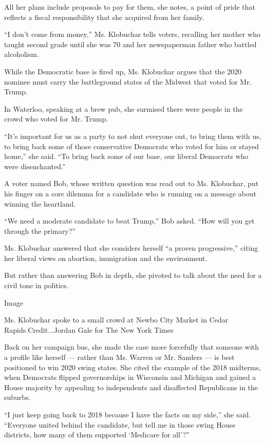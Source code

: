 All her plans include proposals to pay for them, she notes, a point of
pride that reflects a fiscal responsibility that she acquired from her
family.

``I don't come from money,'' Ms. Klobuchar tells voters, recalling her
mother who taught second grade until she was 70 and her newspaperman
father who battled alcoholism.

While the Democratic base is fired up, Ms. Klobuchar argues that the
2020 nominee must carry the battleground states of the Midwest that
voted for Mr. Trump.

In Waterloo, speaking at a brew pub, she surmised there were people in
the crowd who voted for Mr. Trump.

``It's important for us as a party to not shut everyone out, to bring
them with us, to bring back some of those conservative Democrats who
voted for him or stayed home,'' she said. ``To bring back some of our
base, our liberal Democrats who were disenchanted.''

A voter named Bob, whose written question was read out to Ms. Klobuchar,
put his finger on a core dilemma for a candidate who is running on a
message about winning the heartland.

``We need a moderate candidate to beat Trump,'' Bob asked. ``How will
you get through the primary?''

Ms. Klobuchar answered that she considers herself ``a proven
progressive,'' citing her liberal views on abortion, immigration and the
environment.

But rather than answering Bob in depth, she pivoted to talk about the
need for a civil tone in politics.

Image

Ms. Klobuchar spoke to a small crowd at Newbo City Market in Cedar
Rapids.Credit...Jordan Gale for The New York Times

Back on her campaign bus, she made the case more forcefully that someone
with a profile like herself --- rather than Ms. Warren or Mr. Sanders
--- is best positioned to win 2020 swing states. She cited the example
of the 2018 midterms, when Democrats flipped governorships in Wisconsin
and Michigan and gained a House majority by appealing to independents
and disaffected Republicans in the suburbs.

``I just keep going back to 2018 because I have the facts on my side,''
she said. ``Everyone united behind the candidate, but tell me in those
swing House districts, how many of them supported `Medicare for all'?''


